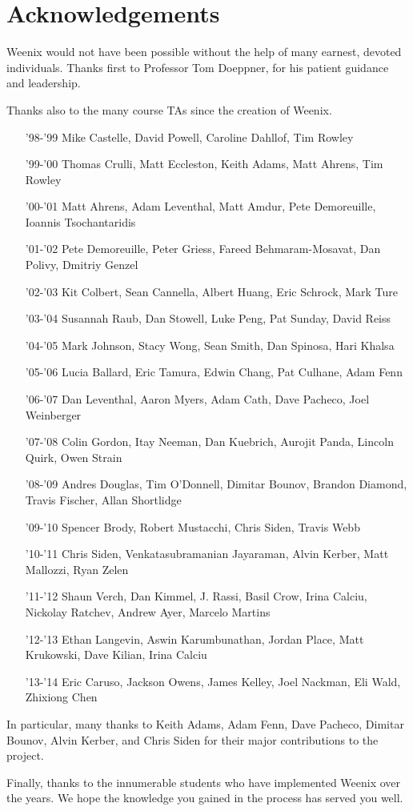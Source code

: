 \section{Acknowledgements}
Weenix would not have been possible without the help of many earnest, devoted individuals. Thanks first to Professor Tom Doeppner, for his patient guidance and leadership.

Thanks also to the many course TAs since the creation of Weenix.
\begin{itemize}
    \item['98-'99] Mike Castelle, David Powell, Caroline Dahllof, Tim Rowley
    \item['99-'00] Thomas Crulli, Matt Eccleston, Keith Adams, Matt Ahrens, Tim Rowley
    \item['00-'01] Matt Ahrens, Adam Leventhal, Matt Amdur, Pete Demoreuille, Ioannis Tsochantaridis
    \item['01-'02] Pete Demoreuille, Peter Griess, Fareed Behmaram-Mosavat, Dan Polivy, Dmitriy Genzel
    \item['02-'03] Kit Colbert, Sean Cannella, Albert Huang, Eric Schrock, Mark Ture
    \item['03-'04] Susannah Raub, Dan Stowell, Luke Peng, Pat Sunday, David Reiss
    \item['04-'05] Mark Johnson, Stacy Wong, Sean Smith, Dan Spinosa, Hari Khalsa
    \item['05-'06] Lucia Ballard, Eric Tamura, Edwin Chang, Pat Culhane, Adam Fenn
    \item['06-'07] Dan Leventhal, Aaron Myers, Adam Cath, Dave Pacheco, Joel Weinberger
    \item['07-'08] Colin Gordon, Itay Neeman, Dan Kuebrich, Aurojit Panda, Lincoln Quirk, Owen Strain
    \item['08-'09] Andres Douglas, Tim O'Donnell, Dimitar Bounov, Brandon Diamond, Travis Fischer, Allan Shortlidge
    \item['09-'10] Spencer Brody, Robert Mustacchi, Chris Siden, Travis Webb
    \item['10-'11] Chris Siden, Venkatasubramanian Jayaraman, Alvin Kerber, Matt Mallozzi, Ryan Zelen
    \item['11-'12] Shaun Verch, Dan Kimmel, J. Rassi, Basil Crow, Irina	Calciu, Nickolay Ratchev, Andrew Ayer, Marcelo Martins
    \item['12-'13] Ethan Langevin, Aswin Karumbunathan, Jordan Place, Matt Krukowski, Dave Kilian, Irina Calciu
    \item['13-'14] Eric Caruso, Jackson Owens, James Kelley, Joel Nackman, Eli Wald, Zhixiong Chen
\end{itemize}
In particular, many thanks to Keith Adams, Adam Fenn, Dave Pacheco, Dimitar Bounov, Alvin Kerber, and Chris Siden for their major contributions to the project.

Finally, thanks to the innumerable students who have implemented Weenix over the years. We hope the knowledge you gained in the process has served you well.

